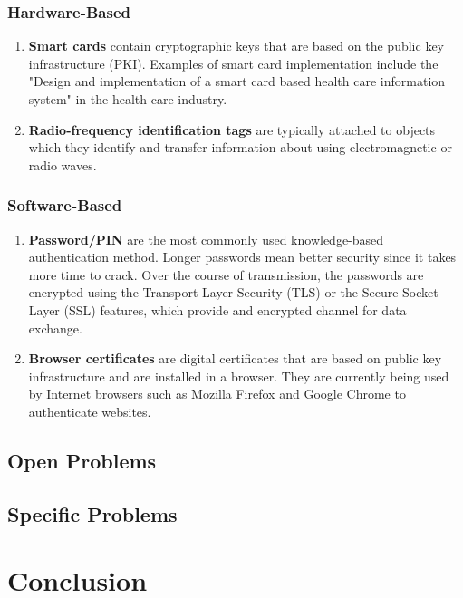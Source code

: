 \documentclass[a4paper, 12pt]{article}
\begin{document}
\subsubsection{Hardware-Based}
\begin{enumerate}
    \item \textbf{Smart cards} contain cryptographic keys that are based on the public key infrastructure (PKI). \cite{AAMHS2011}
    Examples of smart card implementation include the "Design and implementation of a smart card based health care information system" in the health care industry. \cite{KardasTunali2006}
    \item \textbf{Radio-frequency identification tags} are typically attached to objects which they identify and transfer information about using electromagnetic or radio waves.
\end{enumerate}

\subsubsection{Software-Based}
\begin{enumerate}
    \item \textbf{Password/PIN} are the most commonly used knowledge-based authentication method. Longer passwords mean better security since it takes more time to crack. Over the course of transmission, the passwords are encrypted using the Transport Layer Security (TLS) or the Secure Socket Layer (SSL) features, which provide and encrypted channel for data exchange.
    \item \textbf{Browser certificates} are digital certificates that are based on public key infrastructure and are installed in a browser. They are currently being used by Internet browsers such as Mozilla Firefox and Google Chrome to authenticate websites. \cite{AAMHS2011}
\end{enumerate}

\subsection{Open Problems}

\subsection{Specific Problems}

\section{Conclusion}



\end{document}
